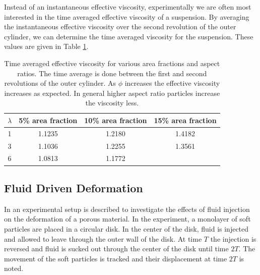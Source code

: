 \documentclass[preprint, 10pt]{elsarticle}
\begin{document}
Instead of an instantaneous effective viscosity, experimentally we are often most interested in the time averaged effective viscosity of a suspension. By averaging the instantaneous effective viscosity over the second revolution of the outer cylinder, we can determine the time averaged viscosity for the suspension. These values are given in Table \ref{tab:viscosity}.
\begin{table}[!h]
\begin{center}
\begin{tabular}{c| c | c |  c}
$\lambda$ & 5\% area fraction  & 10\% area fraction  & 15\% area fraction\\
\hline
1 & 1.1235 & 1.2180 & 1.4182 \\
3 & 1.1036& 1.2255 &  1.3561\\
6 & 1.0813 & 1.1772 & 
\end{tabular}
\end{center}
\caption{Time averaged effective viscosity for various area fractions and aspect ratios. The time average is done between the first and second revolutions of the outer cylinder. As $\phi$ increases the effective viscosity increases as expected. In general higher aspect ratio particles increase the viscosity less. }\label{tab:viscosity}
\end{table}




\FloatBarrier
\subsection{Fluid Driven Deformation}

In \cite{MacMinn2015} an experimental setup is described to investigate the
effects of fluid injection on the deformation of a porous material. In the
experiment, a monolayer of soft particles are placed in a circular disk. In the
center of the disk, fluid is injected and allowed to leave through the outer
wall of the disk. At time $T$ the injection is reversed and fluid is sucked out
through the center of the disk until time $2T$. The movement of the soft
particles is tracked and their displacement at time $2T$ is noted.
\end{document}
